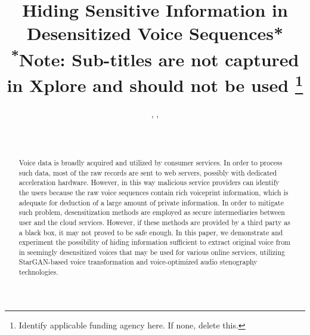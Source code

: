 \documentclass[journal]{IEEEtran} %
\begin{document}
\begin{CJK*}{UTF8}{gbsn}

\title{Hiding Sensitive Information in Desensitized Voice Sequences*\\
{\footnotesize \textsuperscript{*}Note: Sub-titles are not captured in Xplore and should not be used}
\thanks{Identify applicable funding agency here. If none, delete this.}
}

\author{%
    , %
    , %
    \\%
    \\%
    \\%
}

\maketitle

\begin{abstract}
Voice data is broadly acquired and utilized by consumer services. In order to process such data, most of the raw records are sent to web servers, possibly with dedicated acceleration hardware. However, in this way malicious service providers can identify the users because the raw voice sequences contain rich voiceprint information, which is adequate for deduction of a large amount of private information. In order to mitigate such problem, desensitization methods are employed as secure intermediaries between user and the cloud services. However, if these methods are provided by a third party as a black box, it may not proved to be safe enough. In this paper, we demonstrate and experiment the possibility of hiding information sufficient to extract original voice from in seemingly desensitized voices that may be used for various online services, utilizing StarGAN-based voice transformation and voice-optimized audio stenography technologies.
\end{abstract}


\end{CJK*}
\end{document}
